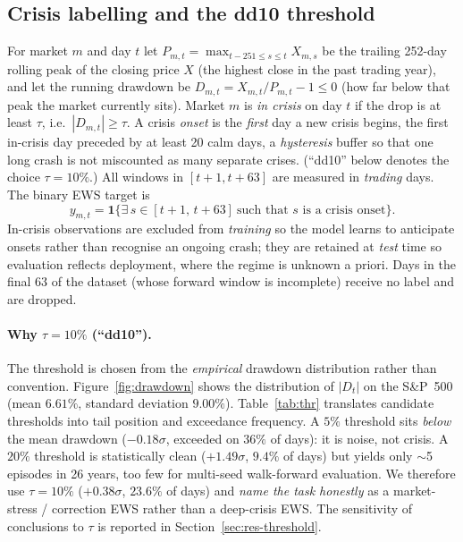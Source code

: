 \documentclass[11pt,a4paper]{article}
\begin{document}
\subsection{Crisis labelling and the dd10 threshold}
\label{sec:method-label}
For market $m$ and day $t$ let $P_{m,t}=\max_{t-251\le s\le t} X_{m,s}$ be the
trailing 252-day rolling peak of the closing price $X$ (the highest close in the
past trading year), and let the running drawdown be
$D_{m,t}=X_{m,t}/P_{m,t}-1\le 0$ (how far below that peak the market currently
sits). Market $m$ is \emph{in crisis} on day $t$ if the drop is at least $\tau$,
i.e.\ $|D_{m,t}|\ge \tau$. A crisis \emph{onset} is the \emph{first} day a new
crisis begins, the first in-crisis day preceded by at least 20 calm days, a
\emph{hysteresis} buffer so that one long crash is not miscounted as many
separate crises. (``dd10'' below denotes the choice $\tau=10\%$.) All windows in
$[t{+}1,t{+}63]$ are measured in \emph{trading} days. The binary EWS target is
\begin{equation}
y_{m,t}=\mathbf{1}\bigl\{\exists\, s\in[t{+}1,\,t{+}63]\ \text{such that $s$ is a crisis onset}\bigr\}.
\label{eq:label}
\end{equation}
In-crisis observations are excluded from \emph{training} so the model learns to
anticipate onsets rather than recognise an ongoing crash; they are retained at
\emph{test} time so evaluation reflects deployment, where the regime is unknown
a priori. Days in the final 63 of the dataset (whose forward window is
incomplete) receive no label and are dropped.

\paragraph{Why $\tau=10\%$ (``dd10'').} The threshold is chosen from the
\emph{empirical} drawdown distribution rather than convention.
Figure~\ref{fig:drawdown} shows the distribution of $|D_t|$ on the S\&P~500
(mean $6.61\%$, standard deviation $9.00\%$). Table~\ref{tab:thr} translates
candidate thresholds into tail position and exceedance frequency. A $5\%$
threshold sits \emph{below} the mean drawdown ($-0.18\sigma$, exceeded on
$36\%$ of days): it is noise, not crisis. A $20\%$ threshold is statistically
clean ($+1.49\sigma$, $9.4\%$ of days) but yields only $\sim$5 episodes in 26
years, too few for multi-seed walk-forward evaluation. We therefore use
$\tau=10\%$ ($+0.38\sigma$, $23.6\%$ of days) and \emph{name the task
honestly} as a market-stress / correction EWS rather than a deep-crisis EWS.
The sensitivity of conclusions to $\tau$ is reported in
Section~\ref{sec:res-threshold}.
\end{document}

